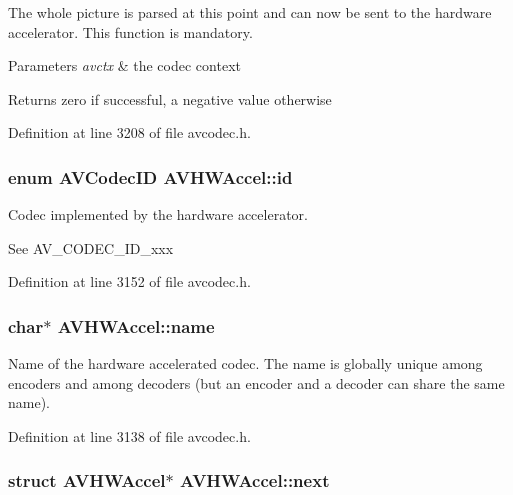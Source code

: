 The whole picture is parsed at this point and can now be sent to the hardware accelerator. This function is mandatory.


\begin{DoxyParams}{Parameters}
{\em avctx} & the codec context \\
\hline
\end{DoxyParams}
\begin{DoxyReturn}{Returns}
zero if successful, a negative value otherwise 
\end{DoxyReturn}


Definition at line 3208 of file avcodec.\+h.

\subsubsection[{\texorpdfstring{id}{id}}]{\setlength{\rightskip}{0pt plus 5cm}enum {\bf A\+V\+Codec\+ID} A\+V\+H\+W\+Accel\+::id}\hypertarget{struct_a_v_h_w_accel_a3c93d40193e9178eb7408295c6c2b2f2}{}\label{struct_a_v_h_w_accel_a3c93d40193e9178eb7408295c6c2b2f2}
Codec implemented by the hardware accelerator.

See A\+V\+\_\+\+C\+O\+D\+E\+C\+\_\+\+I\+D\+\_\+xxx 

Definition at line 3152 of file avcodec.\+h.

\subsubsection[{\texorpdfstring{name}{name}}]{ char$\ast$ A\+V\+H\+W\+Accel\+::name}\hypertarget{struct_a_v_h_w_accel_a9cc735be128cb62ff4cb594d3e3bdb92}{}\label{struct_a_v_h_w_accel_a9cc735be128cb62ff4cb594d3e3bdb92}
Name of the hardware accelerated codec. The name is globally unique among encoders and among decoders (but an encoder and a decoder can share the same name). 

Definition at line 3138 of file avcodec.\+h.

\subsubsection[{\texorpdfstring{next}{next}}]{\setlength{\rightskip}{0pt plus 5cm}struct {\bf A\+V\+H\+W\+Accel}$\ast$ A\+V\+H\+W\+Accel\+::next}\hypertarget{struct_a_v_h_w_accel_aaca69ddfacfa72b642007b5ab4b89424}{}\label{struct_a_v_h_w_accel_aaca69ddfacfa72b642007b5ab4b89424}


